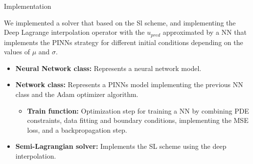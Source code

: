 \begin{frame}{Implementation}

    We implemented a solver that based on the Sl scheme, and implementing the Deep Lagrange interpolation operator with the $u_{pred}$ approximated by a  NN  that  implements the  PINNs  strategy 
    for  different  initial  conditions depending on the values of $\mu$ and $\sigma$.
    
    \vspace{0.3cm}

    \begin{itemize}
        \item \textbf{Neural Network class:} Represents a neural network model.
        \item \textbf{Network class:} Represents a PINNs model implementing the previous NN class and the Adam optimizer algorithm.
        \begin{itemize}
            \item \textbf{Train function:} Optimization step for training a NN by combining  PDE  constraints, data  fitting and boundary conditions, implementing the MSE loss, and a backpropagation step. 
        \end{itemize}  
        \item \textbf{Semi-Lagrangian solver:} Implements the SL scheme using the deep interpolation.  

    \end{itemize}
   
     
\end{frame}
